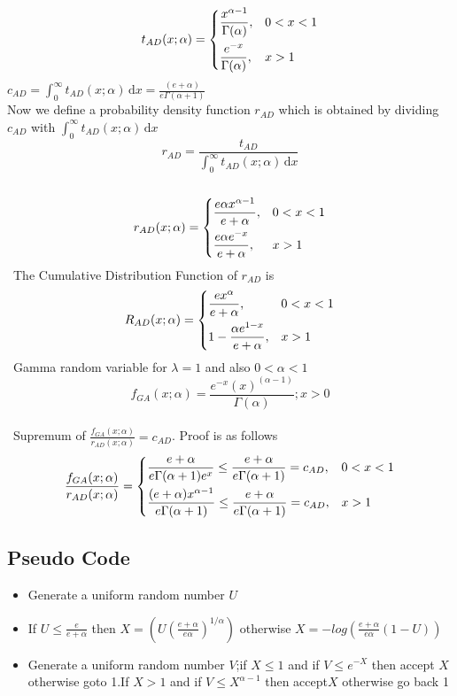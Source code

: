 \documentclass[11pt]{article}
\begin{document}
\[
t_{AD}(x;\alpha)=
\begin{dcases}
\frac{x^{\alpha-1}}{\Gamma(\alpha)}, & 0<x<1 \\
\frac{e^{-x}}{\Gamma(\alpha)}, & x>1
\end{dcases}
\]
$c_{AD}=\int_0^\infty t_{AD}(x;\alpha)\,\mathrm{d}x=\frac{(e+\alpha)}{e\Gamma(\alpha+1)}$\\
Now  we define a probability density function $r_{AD}$ which is obtained by dividing $c_{AD}$ with $\int_0^\infty t_{AD}(x;\alpha)\,\mathrm{d}x$\\
$$r_{AD}=\frac{t_{AD}}{\int_0^\infty t_{AD}(x;\alpha)\,\mathrm{d}x}$$\\
\[
r_{AD}(x;\alpha)=
\begin{dcases}
\frac{e\alpha x^{\alpha-1}}{e+\alpha}, & 0<x<1 \\
\frac{e\alpha e^{-x}}{e+\alpha}, & x>1
\end{dcases}
\]
\ The Cumulative Distribution Function of $r_{AD}$ is\\
\[
R_{AD}(x;\alpha)=
\begin{dcases}
\frac{e x^{\alpha}}{e+\alpha}, & 0<x<1 \\
1-\frac{\alpha e^{1-x}}{e+\alpha}, & x>1
\end{dcases}
\]
\ Gamma random variable for $\lambda=1$ and also $0<\alpha<1$\\

$$f_{GA}(x;\alpha)=
\frac{e^{- x}( x)^{(\alpha-1)}}{\Gamma(\alpha)};x>0$$ \\

\ \Large Supremum of $\frac{f_{GA}(x;\alpha)}{r_{AD}(x;\alpha)}=c_{AD}$. Proof is as follows\\
\[
\frac{f_{GA}(x;\alpha)}{r_{AD}(x;\alpha)}=
\begin{dcases}
\frac{e+\alpha}{e\Gamma(\alpha+1)e^{x}}\leq \frac{e+\alpha}{e\Gamma(\alpha+1)}=c_{AD},&0<x<1\\
\frac{(e+\alpha)x^{\alpha-1}}{e\Gamma(\alpha+1)}\leq  \frac{e+\alpha}{e\Gamma(\alpha+1)}=c_{AD},& x>1
\end{dcases}
\]
\subsection{Pseudo Code}
\begin{itemize}
\item Generate a uniform random number $U$
\item If $U\leq\frac{e}{e+\alpha}$ then $X=\left(U\left(\frac{e+\alpha}{e\alpha}\right)^{1/\alpha}\right)$ otherwise $X=-log(\frac{e+\alpha}{e\alpha}(1-U))$
\item Generate a uniform random number $V$;if $X\leq 1$  and if $V\leq e^{-X}$ then accept $X$ otherwise goto 1.If $X>1$ and if $V\leq X^{\alpha-1}$ then accept$X$ otherwise go back 1
\end{itemize}
\end{document}
